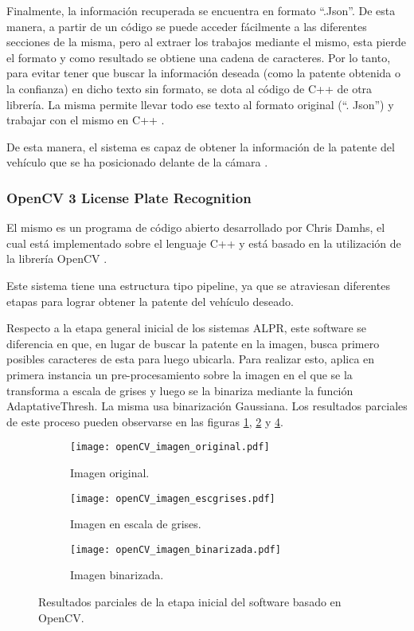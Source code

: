 Finalmente, la información recuperada se encuentra en formato “.Json”. De esta manera, a partir de un código se puede acceder fácilmente a las diferentes secciones de la misma, pero al extraer los trabajos mediante el mismo, esta pierde el formato y como resultado se obtiene una cadena de caracteres. Por lo tanto, para evitar tener que buscar la información deseada (como la patente obtenida o la confianza) en dicho texto sin formato, se dota al código de C++ de otra librería. La misma permite llevar todo ese texto al formato original (“. Json”) y trabajar con el mismo en C++ \cite{jsoncons}.

De esta manera, el sistema es capaz de obtener la información de la patente del vehículo que se ha posicionado delante de la cámara \cite{alprd}. 



\subsubsection{OpenCV 3 License Plate Recognition}
El mismo es un programa de código abierto desarrollado por Chris Damhs, el cual está implementado sobre el lenguaje C++ y está basado en la utilización de la librería OpenCV \cite{libreriaopencv}.

Este sistema tiene una estructura tipo pipeline, ya que se atraviesan diferentes etapas para lograr obtener la patente del vehículo deseado.

Respecto a la etapa general inicial de los sistemas ALPR, este software se diferencia en que, en lugar de buscar la patente en la imagen, busca primero posibles caracteres de esta para luego ubicarla. Para realizar esto, aplica en primera instancia un pre-procesamiento sobre la imagen en el que se la transforma a escala de grises y luego se la binariza mediante la función AdaptativeThresh. La misma usa binarización Gaussiana. Los resultados parciales de este proceso pueden observarse en las figuras \ref{fig:img_orig_opencv}, \ref{fig:img_escGrey_opencv} y \ref{fig:img_bin_opencv}.

\begin{figure}[H]
	\centering
	\begin{subfigure}[b]{0.49\textwidth}
		\texttt{[image: openCV\_imagen\_original.pdf]}
		\caption{Imagen original.}
		\label{fig:img_orig_opencv}
	\end{subfigure}
	\hfill
	\begin{subfigure}[b]{0.49\textwidth}
		\texttt{[image: openCV\_imagen\_escgrises.pdf]}
		\caption{Imagen en escala de grises.}
		\label{fig:img_escGrey_opencv}
	\end{subfigure}
	\hfill
	\begin{subfigure}[b]{0.49\textwidth}
		\texttt{[image: openCV\_imagen\_binarizada.pdf]}
		\caption{Imagen binarizada.}
		\label{fig:img_bin_opencv}
	\end{subfigure}
	\caption{Resultados parciales de la etapa inicial del software basado en OpenCV.}
\end{figure}

